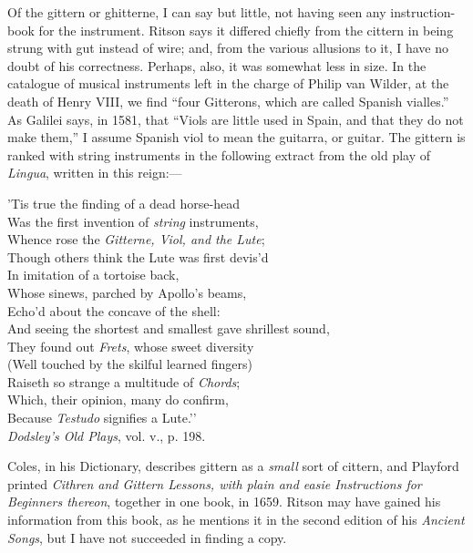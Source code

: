 Of the gittern or ghitterne, I can say but little, not having seen any instruction-book
for the instrument. Ritson says it \pagebreak differed chiefly from the cittern
in being strung with gut instead of wire; and, from the various allusions to it,
I have no doubt of his correctness. Perhaps, also, it was somewhat less in size.
In the catalogue of musical instruments left in the charge of Philip van Wilder,
at the death of Henry VIII, we find “four Gitterons, which are called Spanish
vialles.” As Galilei says, in 1581, that “Viols are little used in Spain, and that
they do not make them,”
I assume Spanish viol to mean the guitarra, or guitar.
The gittern is ranked with string instruments in the following extract from the
old play of \textit{Lingua}, written in this reign:—

\settowidth{\versewidth}{’Tis true the finding of a dead horse-head}
\begin{scverse}
’Tis true the finding of a dead horse-head\\
Was the first invention of \textit{string} instruments,\\
Whence rose the \textit{Gitterne, Viol, and the Lute};\\
Though others think the Lute was first devis’d\\
In imitation of a tortoise back,\\
Whose sinews, parched by Apollo’s beams,\\
Echo’d about the concave of the shell:\\
And seeing the shortest and smallest gave shrillest sound,\\
They found out \textit{Frets}, whose sweet diversity\\
(Well touched by the skilful learned fingers)\\
Raiseth so strange a multitude of \textit{Chords};\\
Which, their opinion, many do confirm,\\
Because \textit{Testudo} signifies a Lute.’’\\
\vin\vin\vin\vin\vin\vin\textit{Dodsley's Old Plays}, vol. v., p. 198.
\end{scverse}


Coles, in his Dictionary, describes gittern as a \textit{small} sort of cittern, and Playford
printed \textit{Cithren and Gittern Lessons, with plain and easie Instructions for Beginners
thereon}, together in one book, in 1659. Ritson may have gained his information
from this book, as he mentions it in the second edition of his \textit{Ancient Songs}, but
I have not succeeded in finding a copy.

